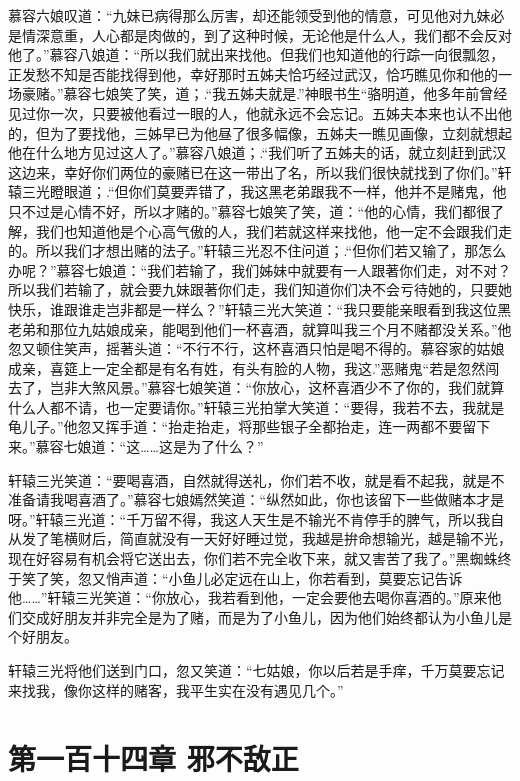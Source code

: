 \documentclass[12pt,oneside]{book}
\begin{document}
慕容六娘叹道：``九妹已病得那么厉害，却还能领受到他的情意，可见他对九妹必是情深意重，人心都是肉做的，到了这种时候，无论他是什么人，我们都不会反对他了。''慕容八娘道：``所以我们就出来找他。但我们也知道他的行踪一向很瓢忽，正发愁不知是否能找得到他，幸好那时五姊夫恰巧经过武汉，恰巧瞧见你和他的一场豪赌。''慕容七娘笑了笑，道；.``我五姊夫就是.''神眼书生``骆明道，他多年前曾经见过你一次，只要被他看过一眼的人，他就永远不会忘记。五姊夫本来也认不出他的，但为了要找他，三姊早已为他昼了很多幅像，五姊夫一瞧见画像，立刻就想起他在什么地方见过这人了。''慕容八娘道；.``我们听了五姊夫的话，就立刻赶到武汉这边来，幸好你们两位的豪赌已在这一带出了名，所以我们很快就找到了你们。''轩辕三光瞪眼道；.``但你们莫要弄错了，我这黑老弟跟我不一样，他并不是赌鬼，他只不过是心情不好，所以才赌的。''慕容七娘笑了笑，道：``他的心情，我们都很了解，我们也知道他是个心高气傲的人，我们若就这样来找他，他一定不会跟我们走的。所以我们才想出赌的法子。''轩辕三光忍不住问道；.``但你们若又输了，那怎么办呢？''慕容七娘道：``我们若输了，我们姊妹中就要有一人跟著你们走，对不对？所以我们若输了，就会要九妹跟著你们走，我们知道你们决不会亏待她的，只要她快乐，谁跟谁走岂非都是一样么？''轩辕三光大笑道：``我只要能亲眼看到我这位黑老弟和那位九姑娘成亲，能喝到他们一杯喜酒，就算叫我三个月不赌都没关系。''他忽又顿住笑声，摇著头道：``不行不行，这杯喜酒只怕是喝不得的。慕容家的姑娘成亲，喜筵上一定全都是有名有姓，有头有脸的人物，我这.''恶赌鬼``若是忽然闯去了，岂非大煞风景。''慕容七娘笑道：``你放心，这杯喜酒少不了你的，我们就算什么人都不请，也一定要请你。''轩辕三光拍掌大笑道：``要得，我若不去，我就是龟儿子。''他忽又挥手道：``抬走抬走，将那些银子全都抬走，连一两都不要留下来。''慕容七娘道：``这\ldots\ldots 这是为了什么？''

轩辕三光笑道：``要喝喜酒，自然就得送礼，你们若不收，就是看不起我，就是不准备请我喝喜酒了。''慕容七娘嫣然笑道：``纵然如此，你也该留下一些做赌本才是呀。''轩辕三光道：``千万留不得，我这人天生是不输光不肯停手的脾气，所以我自从发了笔横财后，简直就没有一天好好睡过觉，我越是拚命想输光，越是输不光，现在好容易有机会将它送出去，你们若不完全收下来，就又害苦了我了。''黑蜘蛛终于笑了笑，忽又悄声道：``小鱼儿必定远在山上，你若看到，莫要忘记告诉他\ldots\ldots{}''轩辕三光笑道：``你放心，我若看到他，一定会要他去喝你喜酒的。''原来他们交成好朋友并非完全是为了赌，而是为了小鱼儿，因为他们始终都认为小鱼儿是个好朋友。

轩辕三光将他们送到门口，忽又笑道：``七姑娘，你以后若是手痒，千万莫要忘记来找我，像你这样的赌客，我平生实在没有遇见几个。''

\hypertarget{ux7b2cux4e00ux767eux5341ux56dbux7ae0-ux90aaux4e0dux654cux6b63}{%
\chapter{第一百十四章
邪不敌正}\label{ux7b2cux4e00ux767eux5341ux56dbux7ae0-ux90aaux4e0dux654cux6b63}}
\end{document}
